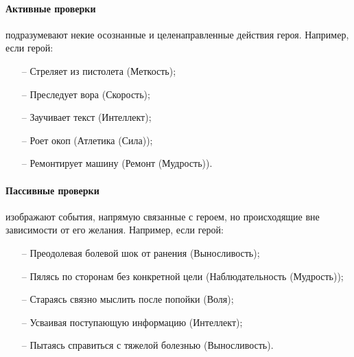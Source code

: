 \paragraph{Активные проверки} подразумевают некие осознанные и целенаправленные действия героя. Например, если герой:
\begin{itemize}
    \item[--] Стреляет из пистолета (Меткость);
    \item[--] Преследует вора (Скорость);
    \item[--] Заучивает текст (Интеллект);
    \item[--] Роет окоп (Атлетика (Сила));
    \item[--] Ремонтирует машину (Ремонт (Мудрость)).
\end{itemize}
\paragraph{Пассивные проверки} изображают события, напрямую связанные с героем, но происходящие вне зависимости от его желания. Например, если герой:
\begin{itemize}
    \item[--] Преодолевая болевой шок от ранения (Выносливость);
    \item[--] Пялясь по сторонам без конкретной цели (Наблюдательность (Мудрость));
    \item[--] Стараясь связно мыслить после попойки (Воля);
    \item[--] Усваивая поступающую информацию (Интеллект);
    \item[--] Пытаясь справиться с тяжелой болезнью (Выносливость).
\end{itemize}

